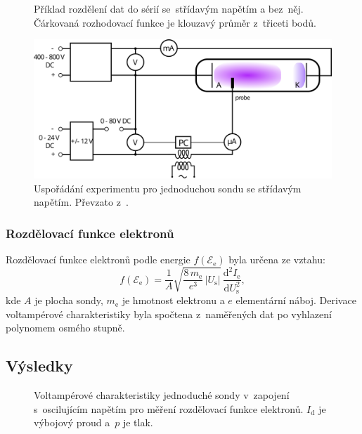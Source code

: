 \documentclass{protokol}
\newcommand\elemcharge{e}
\newcommand\masselec{m_\mathrm{e}}
\newcommand\pres{p}
\newcommand\idisch{I_\mathrm{d}}
\newcommand\ielec{I_\mathrm{e}}
\newcommand\uprobe{U_\mathrm{s}}
\newcommand\enelec{\mathcal E_\mathrm{e}}
\newcommand\eedf{f(\enelec)}
\begin{document}
\begin{figure}[hbp]
	\centering
	
	\caption{Příklad rozdělení dat do sérií se~střídavým napětím a bez~něj.
		Čárkovaná rozhodovací funkce je klouzavý průměr z~třiceti bodů.}
	\label{fig:separation}
\end{figure}

\begin{figure}[hbp]
	\centering
	\includegraphics{diagram-eedf.png}
	\caption{Uspořádání experimentu pro jednoduchou sondu se střídavým napětím.
		Převzato z~\autocite{assignment-simpleprobe}.}
	\label{fig:diagram-eedf}
\end{figure}

\subsubsection{Rozdělovací funkce elektronů}
Rozdělovací funkce elektronů podle energie $\eedf$ byla určena ze vztahu:
\begin{equation}
	\label{eq:eedf}
	\eedf = \frac{1}{A} \sqrt{\frac{8\,\masselec}{\elemcharge^3}\,|\uprobe|}
		\,\frac{\mathrm d^2 \ielec}{\mathrm d\uprobe^2},
\end{equation}
kde $A$ je plocha sondy, $\masselec$ je hmotnost elektronu
a $\elemcharge$ elementární náboj.
Derivace voltampérové charakteristiky byla spočtena z~naměřených dat
po vyhlazení polynomem osmého stupně.

\subsection{Výsledky}
\label{sec:results-eedf}

\begin{figure}[p]
	\centering
	
	
	\par\smallskip
	
	
	\par\smallskip
	
	
	\caption{Voltampérové charakteristiky jednoduché sondy
		v~zapojení s~oscilujícím napětím
		pro měření rozdělovací funkce elektronů.
		$\idisch$ je výbojový proud a~$\pres$ je tlak.}
	\label{fig:simple2-vac}
\end{figure}
\end{document}
